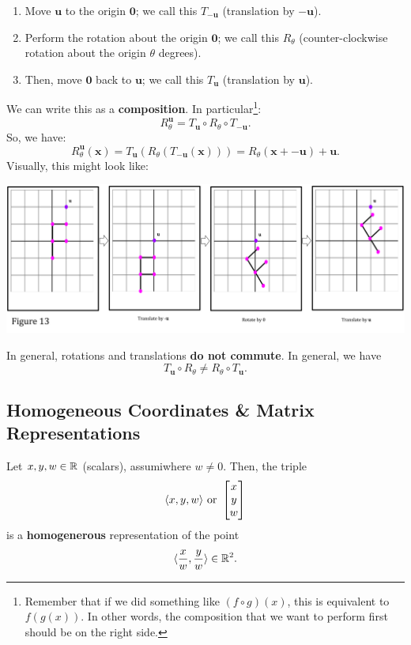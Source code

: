 \documentclass[letterpaper]{article}
\begin{document}
\begin{enumerate}
    \item Move $\mathbf{u}$ to the origin $\mathbf{0}$; we call this $T_{-\mathbf{u}}$ (translation by $-\mathbf{u}$). 
    \item Perform the rotation about the origin $\mathbf{0}$; we call this $R_{\theta}$ (counter-clockwise rotation about the origin $\theta$ degrees).
    \item Then, move $\mathbf{0}$ back to $\mathbf{u}$; we call this $T_{\mathbf{u}}$ (translation by $\mathbf{u}$). 
\end{enumerate}
We can write this as a \textbf{composition}. In particular\footnote{Remember that if we did something like $(f \circ g)(x)$, this is equivalent to $f(g(x))$. In other words, the composition that we want to perform first should be on the right side.}: 
\[R_{\theta}^{\mathbf{u}} = T_{\mathbf{u}} \circ R_{\theta} \circ T_{-\mathbf{u}}.\]
So, we have: 
\[R_{\theta}^{\mathbf{u}}(\mathbf{x}) = T_{\mathbf{u}}(R_{\theta}(T_{-\mathbf{u}}(\mathbf{x}))) = R_{\theta}(\mathbf{x} + -\mathbf{u}) + \mathbf{u}.\]
Visually, this might look like:
\begin{center}
    \includegraphics[scale=0.3]{../assets/f12.png}
\end{center}
In general, rotations and translations \textbf{do not commute}. In general, we have 
\[T_{\mathbf{u}} \circ R_{\theta} \neq R_{\theta} \circ T_{\mathbf{u}}.\]

\subsection{Homogeneous Coordinates \& Matrix Representations}
\begin{definition}{}{}
    Let $x, y, w \in \mathbb{R}$ (scalars), assumiwhere $w \neq 0$. Then, the triple 
    \[\langle x, y, w \rangle \text{ or } \begin{bmatrix}
        x \\ y \\ w 
    \end{bmatrix}\]
    is a \textbf{homogenerous} representation of the point 
    \[\langle \frac{x}{w}, \frac{y}{w} \rangle \in \mathbb{R}^2.\]
\end{definition}
\end{document}
